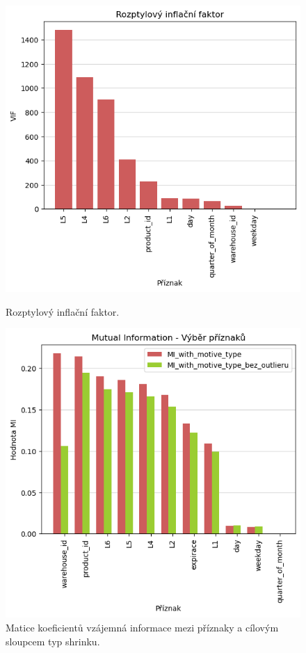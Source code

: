 \begin{figure}
    \centering
    \begin{minipage}{.5\textwidth}
      \centering
      \includegraphics[width=.8\textwidth]{obrazky/zntb/VIF.png}
      \caption{Rozptylový inflační faktor.}
      \label{obr:nb:vif}
    \end{minipage}%
    \begin{minipage}{.5\textwidth}
      \centering
      \includegraphics[width=.8\textwidth]{obrazky/zntb/MI_feature_selection.png}
      \caption{Matice koeficientů vzájemná informace mezi příznaky a cílovým sloupcem typ shrinku.}
      \label{obr:nb:MI_FS}
    \end{minipage}
    \end{figure}


